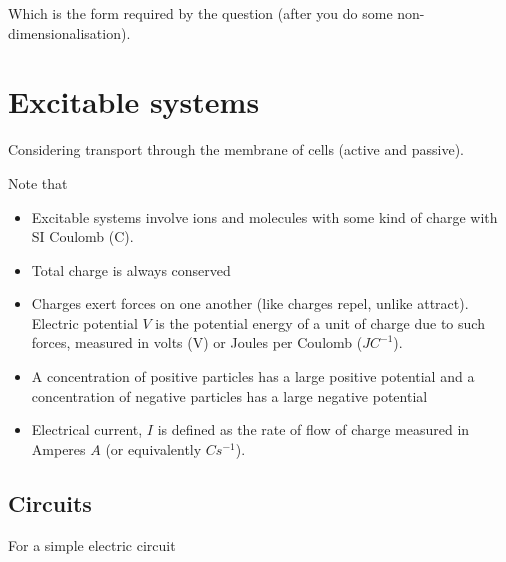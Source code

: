 \documentclass{X:/Documents/Coding/Latex/myassignment}
\begin{document}
Which is the form required by the question (after you do some non-dimensionalisation).

\section{Excitable systems}
Considering transport through the membrane of cells (active and passive).


Note that 
\begin{itemize}
	\item Excitable systems involve ions and molecules with some kind of charge with SI Coulomb (C).
	\item Total charge is always conserved
	\item Charges exert forces on one another (like charges repel, unlike attract). Electric potential $V$ is the potential energy of a unit of charge due to such forces, measured in volts (V) or Joules per Coulomb ($JC^{-1}$).
	\item A concentration of positive particles has a large positive potential and a concentration of negative particles has a large negative potential
	\item Electrical current, $I$ is defined as the rate of flow of charge measured in Amperes $A$ (or equivalently $Cs^{-1}$).
\end{itemize}
\subsection{Circuits}
For a simple electric circuit

\end{document}
